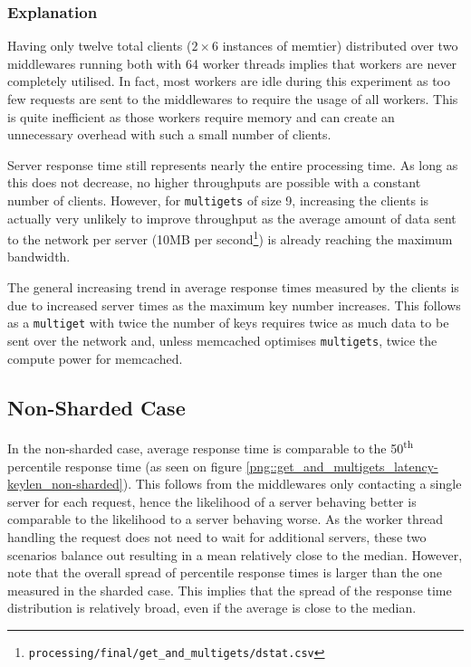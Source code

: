 \documentclass[11pt,a4paper]{article}
\begin{document}
\subsubsection{Explanation}
Having only twelve total clients ($2\times6$ instances of memtier) distributed over two middlewares running both with 64 worker threads implies that workers are never completely utilised. In fact, most workers are idle during this experiment as too few requests are sent to the middlewares to require the usage of all workers. This is quite inefficient as those workers require memory and can create an unnecessary overhead with such a small number of clients.

Server response time still represents nearly the entire processing time. As long as this does not decrease, no higher throughputs are possible with a constant number of clients. However, for \texttt{multigets} of size 9, increasing the clients is actually very unlikely to improve throughput as the average amount of data sent to the network per server (10MB per second\footnote{\texttt{processing/final/get_and_multigets/dstat.csv}}) is already reaching the maximum bandwidth.

The general increasing trend in average response times measured by the clients is due to increased server times as the maximum key number increases. This follows as a \texttt{multiget} with twice the number of keys requires twice as much data to be sent over the network and, unless memcached optimises \texttt{multigets}, twice the compute power for memcached.

\subsection{Non-Sharded Case}
In the non-sharded case, average response time is comparable to the 50\textsuperscript{th} percentile response time (as seen on figure \ref{png::get_and_multigets_latency-keylen_non-sharded}). This follows from the middlewares only contacting a single server for each request, hence the likelihood of a server behaving better is comparable to the likelihood to a server behaving worse. As the worker thread handling the request does not need to wait for additional servers, these two scenarios balance out resulting in a mean relatively close to the median. However, note that the overall spread of percentile response times is larger than the one measured in the sharded case. This implies that the spread of the response time distribution is relatively broad, even if the average is close to the median.
\end{document}
